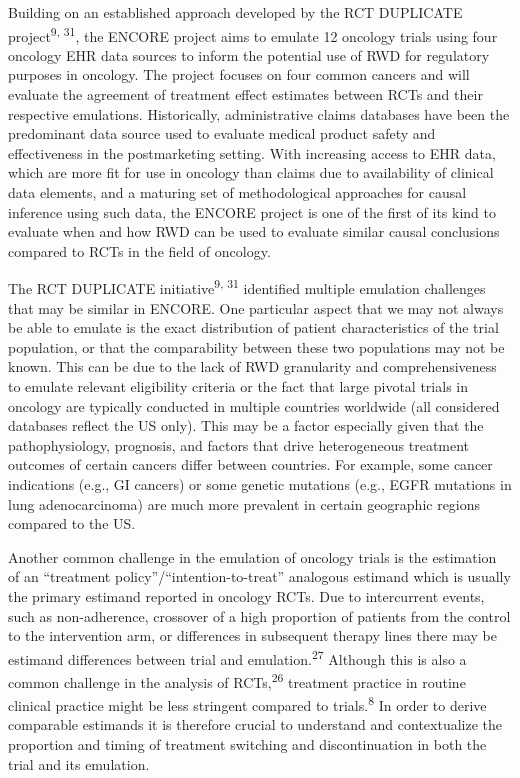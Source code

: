 \documentclass[
  letterpaper,
  DIV=11,
  numbers=noendperiod]{scrartcl}
\begin{document}
Building on an established approach developed by the RCT DUPLICATE
project\textsuperscript{9, 31}, the ENCORE project aims to emulate 12
oncology trials using four oncology EHR data sources to inform the
potential use of RWD for regulatory purposes in oncology. The project
focuses on four common cancers and will evaluate the agreement of
treatment effect estimates between RCTs and their respective emulations.
Historically, administrative claims databases have been the predominant
data source used to evaluate medical product safety and effectiveness in
the postmarketing setting. With increasing access to EHR data, which are
more fit for use in oncology than claims due to availability of clinical
data elements, and a maturing set of methodological approaches for
causal inference using such data, the ENCORE project is one of the first
of its kind to evaluate when and how RWD can be used to evaluate similar
causal conclusions compared to RCTs in the field of oncology.

The RCT DUPLICATE initiative\textsuperscript{9, 31} identified multiple
emulation challenges that may be similar in ENCORE. One particular
aspect that we may not always be able to emulate is the exact
distribution of patient characteristics of the trial population, or that
the comparability between these two populations may not be known. This
can be due to the lack of RWD granularity and comprehensiveness to
emulate relevant eligibility criteria or the fact that large pivotal
trials in oncology are typically conducted in multiple countries
worldwide (all considered databases reflect the US only). This may be a
factor especially given that the pathophysiology, prognosis, and factors
that drive heterogeneous treatment outcomes of certain cancers differ
between countries. For example, some cancer indications (e.g., GI
cancers) or some genetic mutations (e.g., EGFR mutations in lung
adenocarcinoma) are much more prevalent in certain geographic regions
compared to the US.

Another common challenge in the emulation of oncology trials is the
estimation of an ``treatment policy''/``intention-to-treat'' analogous
estimand which is usually the primary estimand reported in oncology
RCTs. Due to intercurrent events, such as non-adherence, crossover of a
high proportion of patients from the control to the intervention arm, or
differences in subsequent therapy lines there may be estimand
differences between trial and emulation.\textsuperscript{27} Although
this is also a common challenge in the analysis of
RCTs,\textsuperscript{26} treatment practice in routine clinical
practice might be less stringent compared to trials.\textsuperscript{8}
In order to derive comparable estimands it is therefore crucial to
understand and contextualize the proportion and timing of treatment
switching and discontinuation in both the trial and its emulation.
\end{document}
